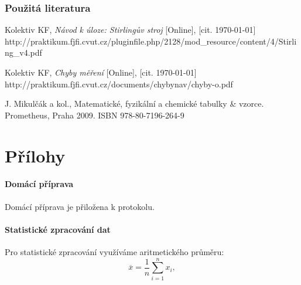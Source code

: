\documentclass[english]{article}
\begin{document}
	
\section {Použitá literatura}
\begingroup
\renewcommand{\section}[2]{}

\begin{thebibliography}{9}
 Kolektiv KF, \emph{Návod k úloze: Stirlingův stroj} [Online], [cit. \today] \newline 
http://praktikum.fjfi.cvut.cz/pluginfile.php/2128/mod\_resource/content/4/Stirling\_v4.pdf


 Kolektiv KF, \emph{Chyby měření} [Online], [cit. \today] \newline http://praktikum.fjfi.cvut.cz/documents/chybynav/chyby-o.pdf

 J. Mikulčák a kol., Matematické, fyzikální a chemické tabulky \& vzorce. Prometheus,
Praha 2009.\newline
ISBN 978-80-7196-264-9

\end{thebibliography}
\endgroup

\clearpage
\part{Přílohy}

\subsection{Domácí příprava}
	Domácí příprava je přiložena k protokolu.
\subsection{Statistické zpracování dat}
	Pro statistické zpracování využíváme aritmetického průměru:
	\begin{equation} \label{eq:aritmeticky_prumer}
	\overline{x} = \frac{1}{n}\sum\limits_{i=1}^{n}x_i,
	\end{equation}
	
\end{document}
